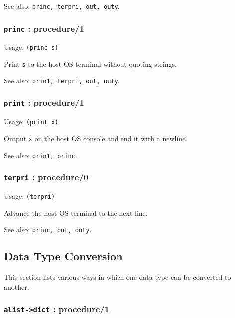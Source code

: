 \documentclass[
]{article}
\newcommand{\passthrough}[1]{#1}
\begin{document}
See also: \passthrough{\lstinline!princ, terpri, out, outy!}.

\hypertarget{princ-procedure1}{%
\subsubsection{\texorpdfstring{\texttt{princ} :
procedure/1}{princ : procedure/1}}\label{princ-procedure1}}

Usage: \passthrough{\lstinline!(princ s)!}

Print \passthrough{\lstinline!s!} to the host OS terminal without
quoting strings.

See also: \passthrough{\lstinline!prin1, terpri, out, outy!}.

\hypertarget{print-procedure1}{%
\subsubsection{\texorpdfstring{\texttt{print} :
procedure/1}{print : procedure/1}}\label{print-procedure1}}

Usage: \passthrough{\lstinline!(print x)!}

Output \passthrough{\lstinline!x!} on the host OS console and end it
with a newline.

See also: \passthrough{\lstinline!prin1, princ!}.

\hypertarget{terpri-procedure0}{%
\subsubsection{\texorpdfstring{\texttt{terpri} :
procedure/0}{terpri : procedure/0}}\label{terpri-procedure0}}

Usage: \passthrough{\lstinline!(terpri)!}

Advance the host OS terminal to the next line.

See also: \passthrough{\lstinline!princ, out, outy!}.

\hypertarget{data-type-conversion}{%
\subsection{Data Type Conversion}\label{data-type-conversion}}

This section lists various ways in which one data type can be converted
to another.

\hypertarget{alist-dict-procedure1}{%
\subsubsection{\texorpdfstring{\texttt{alist-\textgreater{}dict} :
procedure/1}{alist-\textgreater dict : procedure/1}}\label{alist-dict-procedure1}}
\end{document}
